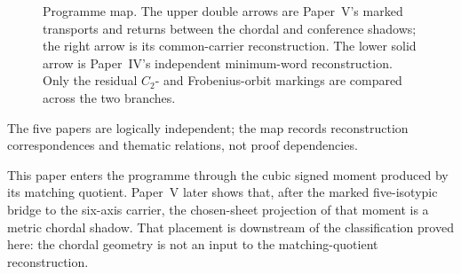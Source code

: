 \documentclass[11pt]{article}
\theoremstyle{definition}
\theoremstyle{remark}
\newcommand{\F}{\mathbb{F}}
\begin{document}
\begin{figure}[H]
\centering
{}
\caption{Programme map.  The upper double arrows are Paper~V's marked
transports and returns between the chordal and conference shadows; the right
arrow is its common-carrier reconstruction.  The lower solid arrow is
Paper~IV's independent minimum-word reconstruction.  Only the residual
\(C_2\)- and Frobenius-orbit markings are compared across the two branches.}
\label{fig:programme-map}
\end{figure}

The five papers are logically independent; the map records reconstruction
correspondences and thematic relations, not proof dependencies.

This paper enters the programme through the cubic signed moment produced by
its matching quotient.  Paper~V later shows that, after the marked
five-isotypic bridge to the six-axis carrier, the chosen-sheet projection of
that moment is a metric chordal shadow.  That placement is downstream of the
classification proved here: the chordal geometry is not an input to the
matching-quotient reconstruction.
\end{document}
